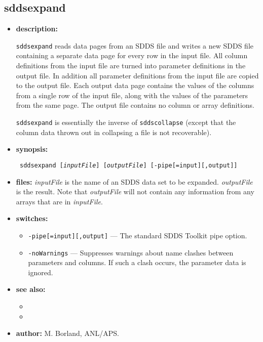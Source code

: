 \newpage
\subsection{sddsexpand}
\label{sddsexpand}

\begin{itemize}
\item {\bf description:}

\verb|sddsexpand| reads data pages from an SDDS file and writes a new
SDDS file containing a separate data page for every row in the input
file.  All column definitions from the input file are turned into
parameter definitions in the output file.  In addition all parameter
definitions from the input file are copied to the output file.  Each
output data page contains the values of the columns from a single row
of the input file, along with the values of the parameters from the
same page.  The output file contains no column or array definitions.

\verb|sddsexpand| is essentially the inverse of \verb|sddscollapse|
(except that the column data thrown out in collapsing a file is not
recoverable).

\item {\bf synopsis:} 
\begin{flushleft}{\tt
sddsexpand [{\em inputFile}] [{\em outputFile}] [-pipe[=input][,output]]
}\end{flushleft}

\item {\bf files:} {\em inputFile} is the name of an SDDS data set to
be expanded.  {\em outputFile} is the result.  Note that {\em
outputFile} will not contain any information from any arrays that are
in {\em inputFile}.

\item {\bf switches:} 
\begin{itemize}
        \item {\tt -pipe[=input][,output]} --- The standard SDDS Toolkit pipe option.
        \item {\tt -noWarnings} --- Suppresses warnings about name clashes between
        parameters and columns.  If such a clash occurs, the parameter data is ignored.
\end{itemize}

\item {\bf see also:}
    \begin{itemize}
    \item {}
    \item {}
    \end{itemize}
\item {\bf author:} M. Borland, ANL/APS.
\end{itemize}



